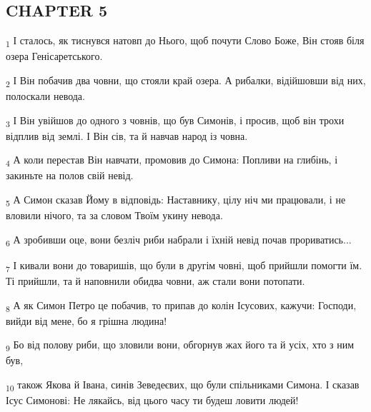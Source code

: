 \subsection{CHAPTER 5}
\begin{tcolorbox}
\textsubscript{1} І сталось, як тиснувся натовп до Нього, щоб почути Слово Боже, Він стояв біля озера Генісаретського.
\end{tcolorbox}
\begin{tcolorbox}
\textsubscript{2} І Він побачив два човни, що стояли край озера. А рибалки, відійшовши від них, полоскали невода.
\end{tcolorbox}
\begin{tcolorbox}
\textsubscript{3} І Він увійшов до одного з човнів, що був Симонів, і просив, щоб він трохи відплив від землі. І Він сів, та й навчав народ із човна.
\end{tcolorbox}
\begin{tcolorbox}
\textsubscript{4} А коли перестав Він навчати, промовив до Симона: Попливи на глибінь, і закиньте на полов свій невід.
\end{tcolorbox}
\begin{tcolorbox}
\textsubscript{5} А Симон сказав Йому в відповідь: Наставнику, цілу ніч ми працювали, і не вловили нічого, та за словом Твоїм укину невода.
\end{tcolorbox}
\begin{tcolorbox}
\textsubscript{6} А зробивши оце, вони безліч риби набрали і їхній невід почав прориватись...
\end{tcolorbox}
\begin{tcolorbox}
\textsubscript{7} І кивали вони до товаришів, що були в другім човні, щоб прийшли помогти їм. Ті прийшли, та й наповнили обидва човни, аж стали вони потопати.
\end{tcolorbox}
\begin{tcolorbox}
\textsubscript{8} А як Симон Петро це побачив, то припав до колін Ісусових, кажучи: Господи, вийди від мене, бо я грішна людина!
\end{tcolorbox}
\begin{tcolorbox}
\textsubscript{9} Бо від полову риби, що зловили вони, обгорнув жах його та й усіх, хто з ним був,
\end{tcolorbox}
\begin{tcolorbox}
\textsubscript{10} також Якова й Івана, синів Зеведеєвих, що були спільниками Симона. І сказав Ісус Симонові: Не лякайсь, від цього часу ти будеш ловити людей!
\end{tcolorbox}
